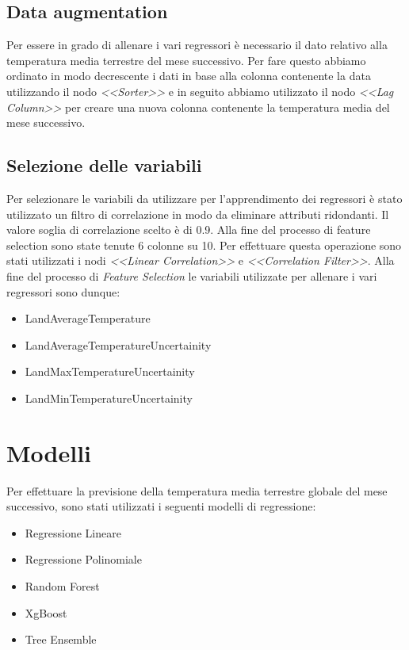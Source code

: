 \documentclass[12pt, a4paper, twocolumn]{article} %
\begin{document}
\subsection{Data augmentation}
Per essere in grado di allenare i vari regressori è necessario il dato relativo alla temperatura media terrestre del mese successivo. Per fare questo abbiamo ordinato in modo decrescente i dati in base alla colonna contenente la data utilizzando il nodo \textit{<<Sorter>>} e in seguito abbiamo utilizzato il nodo \textit{<<Lag Column>>} per creare una nuova colonna contenente la temperatura media del mese successivo.

\subsection{Selezione delle variabili}
Per selezionare le variabili da utilizzare per l'apprendimento dei regressori è stato utilizzato un filtro di correlazione in modo da eliminare attributi ridondanti. Il valore soglia di correlazione scelto è di 0.9. Alla fine del processo di feature selection sono state tenute 6 colonne su 10. Per effettuare questa operazione sono stati utilizzati i nodi \textit{<<Linear Correlation>>} e \textit{<<Correlation Filter>>}. Alla fine del processo di \textit{Feature Selection} le variabili utilizzate per allenare i vari regressori sono dunque: 
\begin{itemize}
	\item LandAverageTemperature
	\item LandAverageTemperatureUncertainity
	\item LandMaxTemperatureUncertainity
	\item LandMinTemperatureUncertainity
\end{itemize}

\section{Modelli}
Per effettuare la previsione della temperatura media terrestre globale del mese successivo, sono stati utilizzati i seguenti modelli di regressione:
\begin{itemize}
	\item Regressione Lineare
	\item Regressione Polinomiale
	\item Random Forest
	\item XgBoost
	\item Tree Ensemble
\end{itemize}
\end{document}
